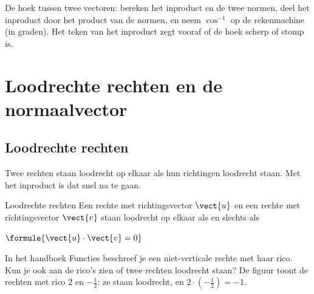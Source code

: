 \begin{werkwijze}
De hoek tussen twee vectoren: bereken het inproduct en de twee normen, deel het inproduct door het product van de normen, en neem $\cos^{-1}$ op de rekenmachine (in graden). Het teken van het inproduct zegt vooraf of de hoek scherp of stomp is.
\end{werkwijze}

\begin{oefeningen}
\end{oefeningen}

\section{Loodrechte rechten en de normaalvector}

\subsection{Loodrechte rechten}

Twee rechten staan loodrecht op elkaar als hun richtingen loodrecht staan. Met het inproduct is dat snel na te gaan.

\begin{theorie}
\begin{stelling}{Loodrechte rechten}
Een rechte met richtingsvector $\vect{u}$ en een rechte met richtingsvector $\vect{v}$ staan loodrecht op elkaar als en slechts als

\vspace{1mm}
\qquad $\formule{\vect{u} \cdot \vect{v} = 0}$
\end{stelling}
\end{theorie}


In het handboek Functies beschreef je een niet-verticale rechte met haar rico. Kun je ook aan de rico's zien of twee rechten loodrecht staan? De figuur toont de rechten met rico $2$ en $-\tfrac12$: ze staan loodrecht, en $2 \cdot ({-\tfrac12}) = -1$.

